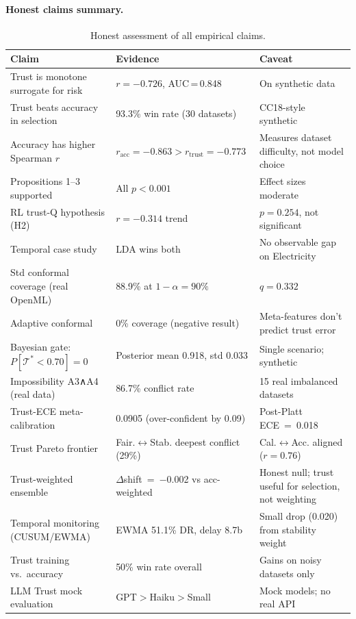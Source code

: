 \documentclass[10pt]{article}
\newcommand{\trust}{\mathcal{T}}
\begin{document}
\paragraph{Honest claims summary.}
\begin{table}[h]
\centering
\caption{Honest assessment of all empirical claims.}
\label{tab:honest}
\begin{tabular}{p{5.5cm}p{3cm}p{3.5cm}}
\toprule
\textbf{Claim} & \textbf{Evidence} & \textbf{Caveat} \\
\midrule
Trust is monotone surrogate for risk & $r{=}{-}0.726$, AUC\,=\,0.848 & On synthetic data \\
Trust beats accuracy in selection & 93.3\% win rate (30 datasets) & CC18-style synthetic \\
Accuracy has higher Spearman $r$ & $r_\text{acc}{=}{-}0.863 > r_\text{trust}{=}{-}0.773$ & Measures dataset difficulty, not model choice \\
Propositions 1--3 supported & All $p{<}0.001$ & Effect sizes moderate \\
RL trust-Q hypothesis (H2) & $r{=}{-}0.314$ trend & $p{=}0.254$, not significant \\
Temporal case study & LDA wins both & No observable gap on Electricity \\
Std conformal coverage (real OpenML) & 88.9\% at $1{-}\alpha{=}90\%$ & $\hat{q}{=}0.332$ \\
Adaptive conformal & 0\% coverage (negative result) & Meta-features don't predict trust error \\
Bayesian gate: $P[\trust^*<0.70]{=}0$ & Posterior mean 0.918, std 0.033 & Single scenario; synthetic \\
Impossibility A3∧A4 (real data) & 86.7\% conflict rate & 15 real imbalanced datasets \\
Trust-ECE meta-calibration & 0.0905 (over-confident by 0.09) & Post-Platt ECE~=~0.018 \\
Trust Pareto frontier & Fair.$\leftrightarrow$Stab. deepest conflict (29\%) & Cal.$\leftrightarrow$Acc. aligned ($r{=}0.76$) \\
Trust-weighted ensemble & $\Delta$shift~=~$-$0.002 vs acc-weighted & Honest null; trust useful for selection, not weighting \\
Temporal monitoring (CUSUM/EWMA) & EWMA 51.1\% DR, delay 8.7b & Small drop (0.020) from stability weight \\
Trust training vs.\ accuracy & 50\% win rate overall & Gains on noisy datasets only \\
LLM Trust mock evaluation & GPT$>$Haiku$>$Small & Mock models; no real API \\
\bottomrule
\end{tabular}
\end{table}
\end{document}
